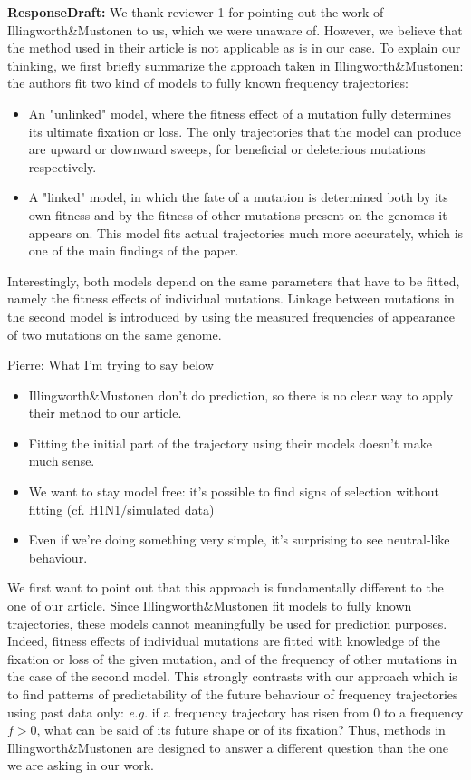 \documentclass[aps,rmp,onecolumn]{revtex4-1}
\newcommand{\pierre}[1]{{\color{red}Pierre: #1}}
\newcommand{\responsedraft}[1]{{\it {\color{purple}\textbf{ResponseDraft:} #1}}}
\begin{document}
\responsedraft{
	We thank reviewer 1 for pointing out the work of Illingworth\&Mustonen to us, which we were unaware of. However, we believe that the method used in their article is not applicable as is in our case. To explain our thinking, we first briefly summarize the approach taken in Illingworth\&Mustonen: the authors fit two kind of models to fully known frequency trajectories: 
	\begin{itemize}
		\item An "unlinked" model, where the fitness effect of a mutation fully determines its ultimate fixation or loss. The only trajectories that the model can produce are upward or downward sweeps, for beneficial or deleterious mutations respectively.
		\item A "linked" model, in which the fate of a mutation is determined both by its own fitness and by the fitness of other mutations present on the genomes it appears on. This model fits actual trajectories much more accurately, which is one of the main findings of the paper.
	\end{itemize} 
	Interestingly, both models depend on the same parameters that have to be fitted, namely the fitness effects of individual mutations. Linkage between mutations in the second model is introduced by using the measured frequencies of appearance of two mutations on the same genome. \\
	\pierre{What I'm trying to say below
	\begin{itemize}
		\item Illingworth\&Mustonen don't do prediction, so there is no clear way to apply their method to our article.
		\item Fitting the initial part of the trajectory using their models doesn't make much sense. 
		\item We want to stay model free: it's possible to find signs of selection without fitting (cf. H1N1/simulated data)
		\item Even if we're doing something very simple, it's surprising to see neutral-like behaviour. 
	\end{itemize}}
	We first want to point out that this approach is fundamentally different to the one of our article. Since Illingworth\&Mustonen fit models to fully known trajectories, these models cannot meaningfully be used for prediction purposes. Indeed, fitness effects of individual mutations are fitted with knowledge of the fixation or loss of the given mutation, and of the frequency of other mutations in the case of the second model. This strongly contrasts with our approach which is to find patterns of predictability of the future behaviour of frequency trajectories using past data only: \emph{e.g.} if a frequency trajectory has risen from $0$ to a frequency $f>0$, what can be said of its future shape or of its fixation? Thus, methods in Illingworth\&Mustonen are designed to answer a different question than the one we are asking in our work. \\
}
\end{document}
